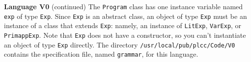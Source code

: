 \begin{minipage}[t]{\sw}
\slidenumber
\LARGE
{\bf Language V0} (continued)\exx
The \verb'Program' class has one instance variable named \verb'exp'
of type \verb'Exp'.
Since \verb'Exp' is an abstract class,
an object of type \verb'Exp' must be an instance of a class
that extends \verb'Exp': namely, an instance
of \verb'LitExp', \verb'VarExp', or \verb'PrimappExp'.
Note that \verb'Exp' does not have a constructor,
so you can't instantiate an object of type \verb'Exp' directly.\exx
The directory \verb'/usr/local/pub/plcc/Code/V0'
contains the specification file, named \verb'grammar', for this language.\exx
\end{minipage}
